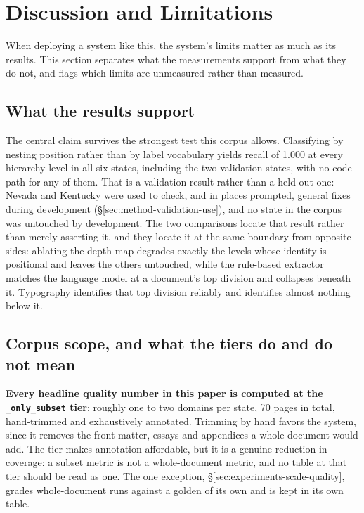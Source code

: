 \section{Discussion and Limitations}
\label{sec:discussion-limitations}

When deploying a system like this, the system's limits matter as much as its
results. This section separates what the measurements support from what they
do not, and flags which limits are unmeasured rather than measured.

\subsection{What the results support}

The central claim survives the strongest test this corpus allows. Classifying
by nesting position rather than by label vocabulary yields recall of 1.000 at
every hierarchy level in all six states, including the two validation states,
with no code path for any of them. That is a validation result rather than a
held-out one: Nevada and Kentucky were used to check, and in places prompted,
general fixes during development (\S\ref{sec:method-validation-use}), and no
state in the corpus was untouched by development. The two comparisons locate that result
rather than merely asserting it, and they locate it at the same boundary from
opposite sides: ablating the depth map degrades exactly the levels whose
identity is positional and leaves the others untouched, while the rule-based
extractor matches the language model at a document's top division and collapses
beneath it. Typography identifies that top division reliably and identifies
almost nothing below it.

\subsection{Corpus scope, and what the tiers do and do not mean}

\textbf{Every headline quality number in this paper is computed at the
\texttt{\_only\_subset} tier}: roughly one to two domains per state, 70 pages
in total, hand-trimmed and exhaustively annotated. Trimming by hand favors the
system, since it removes the front matter, essays and appendices a whole
document would add. The tier makes annotation affordable, but it is a genuine
reduction in coverage: a subset metric is not a whole-document metric, and no table at that
tier should be read as one. The one exception,
\S\ref{sec:experiments-scale-quality}, grades whole-document runs against a
golden of its own and is kept in its own table.

